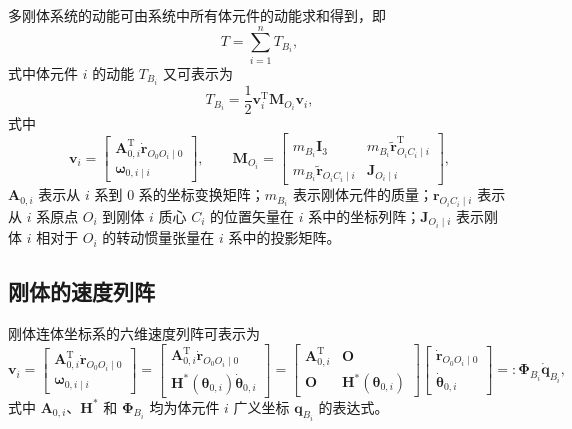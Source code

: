 多刚体系统的动能可由系统中所有体元件的动能求和得到，即
\begin{equation}\label{eq:9.13}
  T = \sum_{i=1}^{n} T_{B_i},
\end{equation}
式中体元件 $i$ 的动能 $T_{B_i}$ 又可表示为
\begin{equation}\label{eq:9.14}
  T_{B_i} = \frac{1}{2} \boldsymbol{v}_i^{\mathrm{T}} \boldsymbol{M}_{O_i} \boldsymbol{v}_i,
\end{equation}
式中
\begin{equation}\label{eq:9.15}
  \boldsymbol{v}_i = \begin{bmatrix} \boldsymbol{A}_{0,i}^{\mathrm{T}} \dot{\boldsymbol{r}}_{O_0 O_i \mid 0} \\ \boldsymbol{\omega}_{0,i \mid i} \end{bmatrix}, \qquad
  \boldsymbol{M}_{O_i} = \begin{bmatrix} m_{B_i} \boldsymbol{I}_3 & m_{B_i} \tilde{\boldsymbol{r}}_{O_i C_i \mid i}^{\mathrm{T}} \\ m_{B_i} \tilde{\boldsymbol{r}}_{O_i C_i \mid i} & \boldsymbol{J}_{O_i \mid i} \end{bmatrix},
\end{equation}
$\boldsymbol{A}_{0,i}$ 表示从 $i$ 系到 $0$ 系的坐标变换矩阵；$m_{B_i}$ 表示刚体元件的质量；$\boldsymbol{r}_{O_i C_i \mid i}$ 表示从 $i$ 系原点 $O_i$ 到刚体 $i$ 质心 $C_i$ 的位置矢量在 $i$ 系中的坐标列阵；$\boldsymbol{J}_{O_i \mid i}$ 表示刚体 $i$ 相对于 $O_i$ 的转动惯量张量在 $i$ 系中的投影矩阵。

\subsection{刚体的速度列阵}

刚体连体坐标系的六维速度列阵可表示为
\begin{equation}\label{eq:9.16}
  \boldsymbol{v}_i = \begin{bmatrix} \boldsymbol{A}_{0,i}^{\mathrm{T}} \dot{\boldsymbol{r}}_{O_0 O_i \mid 0} \\ \boldsymbol{\omega}_{0,i \mid i} \end{bmatrix}
  = \begin{bmatrix} \boldsymbol{A}_{0,i}^{\mathrm{T}} \dot{\boldsymbol{r}}_{O_0 O_i \mid 0} \\ \boldsymbol{H}^*(\boldsymbol{\theta}_{0,i}) \dot{\boldsymbol{\theta}}_{0,i} \end{bmatrix}
  = \begin{bmatrix} \boldsymbol{A}_{0,i}^{\mathrm{T}} & \boldsymbol{O} \\ \boldsymbol{O} & \boldsymbol{H}^*(\boldsymbol{\theta}_{0,i}) \end{bmatrix}
  \begin{bmatrix} \dot{\boldsymbol{r}}_{O_0 O_i \mid 0} \\ \dot{\boldsymbol{\theta}}_{0,i} \end{bmatrix}
  =: \boldsymbol{\Phi}_{B_i} \dot{\boldsymbol{q}}_{B_i},
\end{equation}
式中 $\boldsymbol{A}_{0,i}$、$\boldsymbol{H}^*$ 和 $\boldsymbol{\Phi}_{B_i}$ 均为体元件 $i$ 广义坐标 $\boldsymbol{q}_{B_i}$ 的表达式。

